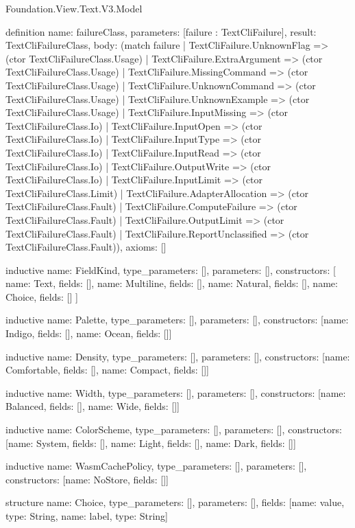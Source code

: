 \begin{lexlean}{Foundation.View.Text.V3.Model}
\begin{semanticmodule}
definition{
  name: failureClass,
  parameters: [failure : TextCliFailure],
  result: TextCliFailureClass,
  body: (match failure
    | TextCliFailure.UnknownFlag => (ctor TextCliFailureClass.Usage)
    | TextCliFailure.ExtraArgument => (ctor TextCliFailureClass.Usage)
    | TextCliFailure.MissingCommand => (ctor TextCliFailureClass.Usage)
    | TextCliFailure.UnknownCommand => (ctor TextCliFailureClass.Usage)
    | TextCliFailure.UnknownExample => (ctor TextCliFailureClass.Usage)
    | TextCliFailure.InputMissing => (ctor TextCliFailureClass.Io)
    | TextCliFailure.InputOpen => (ctor TextCliFailureClass.Io)
    | TextCliFailure.InputType => (ctor TextCliFailureClass.Io)
    | TextCliFailure.InputRead => (ctor TextCliFailureClass.Io)
    | TextCliFailure.OutputWrite => (ctor TextCliFailureClass.Io)
    | TextCliFailure.InputLimit => (ctor TextCliFailureClass.Limit)
    | TextCliFailure.AdapterAllocation => (ctor TextCliFailureClass.Fault)
    | TextCliFailure.ComputeFailure => (ctor TextCliFailureClass.Fault)
    | TextCliFailure.OutputLimit => (ctor TextCliFailureClass.Fault)
    | TextCliFailure.ReportUnclassified => (ctor TextCliFailureClass.Fault)),
  axioms: []
}

inductive{
  name: FieldKind,
  type_parameters: [],
  parameters: [],
  constructors: [
    {name: Text, fields: []},
    {name: Multiline, fields: []},
    {name: Natural, fields: []},
    {name: Choice, fields: []}
  ]
}

inductive{
  name: Palette,
  type_parameters: [],
  parameters: [],
  constructors: [{name: Indigo, fields: []}, {name: Ocean, fields: []}]
}

inductive{
  name: Density,
  type_parameters: [],
  parameters: [],
  constructors: [{name: Comfortable, fields: []}, {name: Compact, fields: []}]
}

inductive{
  name: Width,
  type_parameters: [],
  parameters: [],
  constructors: [{name: Balanced, fields: []}, {name: Wide, fields: []}]
}

inductive{
  name: ColorScheme,
  type_parameters: [],
  parameters: [],
  constructors: [{name: System, fields: []}, {name: Light, fields: []}, {name: Dark, fields: []}]
}

inductive{
  name: WasmCachePolicy,
  type_parameters: [],
  parameters: [],
  constructors: [{name: NoStore, fields: []}]
}

structure{
  name: Choice,
  type_parameters: [],
  parameters: [],
  fields: [{name: value, type: String}, {name: label, type: String}]
}


\end{semanticmodule}
\end{lexlean}
